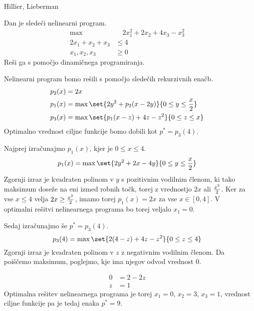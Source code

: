 \begin{naloga}{Hillier, Lieberman}{\cite[Problem~11.3-16]{hl}}
\begin{vprasanje}
Dan je sledeči nelinearni program.
\begin{align*}
\max &\quad 2x_1^2 + 2x_2 + 4x_3 - x_3^2 \\[1ex]
2x_1 + x_2 + x_3 &\le 4 \\
x_1, x_2, x_3 &\ge 0
\end{align*}
Reši ga s pomočjo dinamičnega programiranja.
\end{vprasanje}

\begin{odgovor}
Nelinearni program bomo rešili s pomočjo sledečih rekurzivnih enačb.
\begin{align*}
p_2(x) &= 2x \\
p_1(x) &= \max\set{2y^2 + p_2(x-2y)}{0 \le y \le {x \over 2}} \\
p_3(x) &= \max\set{p_1(x-z) + 4z - z^2}{0 \le z \le x}
\end{align*}
Optimalno vrednost ciljne funkcije bomo dobili kot $p^* = p_3(4)$.

Najprej izračunajmo $p_1(x)$, kjer je $0 \le x \le 4$.
$$
p_1(x) = \max\set{2y^2 + 2x - 4y}{0 \le y \le {x \over 2}}
$$
Zgornji izraz je kvadraten polinom v $y$ s pozitivnim vodilnim členom,
ki tako maksimum doseže na eni izmed robnih točk,
torej z vrednostjo $2x$ ali ${x^2 \over 2}$.
Ker za vse $x \le 4$ velja $2x \ge {x^2 \over 2}$,
imamo torej $p_1(x) = 2x$ za vse $x \in [0, 4]$.
V optimalni rešitvi nelinearnega programa bo torej veljalo $x_1 = 0$.

Sedaj izračunajmo še $p^* = p_3(4)$.
$$
p_3(4) = \max\set{2(4-z) + 4z - z^2}{0 \le z \le 4}
$$
Zgornji izraz je kvadraten polinom v $z$ z negativnim vodilnim členom.
Da po\-išče\-mo maksimum, poglejmo, kje ima njegov odvod vrednost $0$.

\begin{align*}
0 &= 2 - 2z \\
z &= 1
\end{align*}
Optimalna rešitev nelinearnega programa
je torej $x_1 = 0$, $x_2 = 3$, $x_3 = 1$,
vrednost ciljne funkcije pa je tedaj enaka $p^* = 9$.
\end{odgovor}
\end{naloga}
